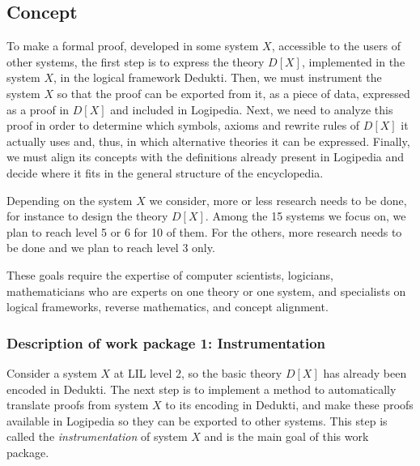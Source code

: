 \subsection{Concept}

To make a formal proof, developed in some system $X$, accessible to
the users of other systems, the first step is to express the theory
$D[X]$, implemented in the system $X$, in the logical framework {\sf
  Dedukti}.  Then, we must instrument the system $X$ so that the proof
can be exported from it, as a piece of data, expressed as a proof in
$D[X]$ and included in {\sf Logipedia}. Next, we need to analyze this
proof in order to determine which symbols, axioms and rewrite rules of
$D[X]$ it actually uses and, thus, in which alternative theories it
can be expressed.  Finally, we must align its concepts with the
definitions already present in {\sf Logipedia} and decide where it
fits in the general structure of the encyclopedia.

Depending on the system $X$ we consider, more or less research needs
to be done, for instance to design the theory $D[X]$. Among the 15
systems we focus on, we plan to reach level 5 or 6 for 10 of them.
For the others, more research needs to be done and we plan to reach
level 3 only.

These goals require the expertise of computer scientists, logicians,
mathematicians who are experts on one theory or one system, and
specialists on logical frameworks, reverse mathematics, and concept
alignment.

\subsubsection{Description of work package 1: Instrumentation}

Consider a system $X$ at LIL level 2, so the basic theory $D[X]$ has
already been encoded in Dedukti. The next step is to implement a
method to automatically translate proofs from system $X$ to its
encoding in Dedukti, and make these proofs available in Logipedia so
they can be exported to other systems. This step is called the
\emph{instrumentation} of system $X$ and is the main goal of this work
package.

